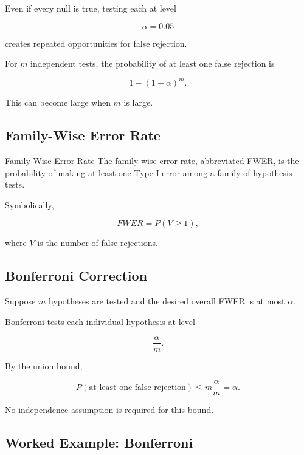 Even if every null is true, testing each at level

\[
\alpha=0.05
\]

creates repeated opportunities for false rejection.

For \(m\) independent tests, the probability of at least one false
rejection is

\[
\boxed{
1-(1-\alpha)^m.
}
\]

This can become large when \(m\) is large.

\subsection{Family-Wise Error Rate}
\label{subsec:family-wise-error-rate}

\begin{definitionbox}{Family-Wise Error Rate}
The family-wise error rate, abbreviated FWER, is the probability of
making at least one Type I error among a family of hypothesis tests.
\end{definitionbox}

Symbolically,

\[
\boxed{
FWER
=
P(V\geq1),
}
\]

where \(V\) is the number of false rejections.

\subsection{Bonferroni Correction}
\label{subsec:bonferroni-testing}

Suppose \(m\) hypotheses are tested and the desired overall FWER is at
most \(\alpha\).

Bonferroni tests each individual hypothesis at level

\[
\boxed{
\frac{\alpha}{m}.
}
\]

By the union bound,

\[
\boxed{
P(\text{at least one false rejection})
\leq
m
\frac{\alpha}{m}
=
\alpha.
}
\]

No independence assumption is required for this bound.

\subsection{Worked Example: Bonferroni}
\label{subsec:worked-bonferroni}

